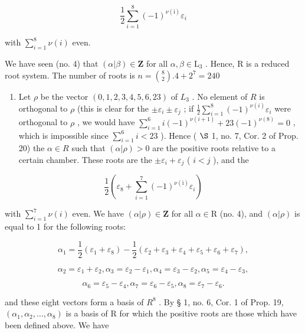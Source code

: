 \[
\frac {1}{2} \sum_ {i = 1} ^ {8} (- 1) ^ {\nu (\mathrm{i})} \varepsilon_ {i}
\]

with \(\sum_{i=1}^{8} \nu(i)\) even.

We have seen (no. 4) that \((\alpha |\beta)\in \mathbf{Z}\) for all \(\alpha ,\beta \in \mathrm{L}_3\) . Hence, R is a reduced root system. The number of roots is \(n = \binom{8}{2}.4 + 2^7 = 240\)

\begin{enumerate}
\def\labelenumi{(\Roman{enumi})}
\setcounter{enumi}{1}
\tightlist
\item
  Let \(\rho\) be the vector \((0,1,2,3,4,5,6,23)\) of \(L_{3}\) . No element of \(R\) is orthogonal to \(\rho\) (this is clear for the \(\pm \varepsilon_{i} \pm \varepsilon_{j}\) ; if \(\frac{1}{2} \sum_{i=1}^{8} (-1)^{\nu(i)} \varepsilon_{i}\) were orthogonal to \(\rho\) , we would have \(\sum_{i=1}^{6} i(-1)^{\nu(i+1)} + 23(-1)^{\nu(8)} = 0\) , which is impossible since \(\sum_{i=1}^{6} i < 23\) ). Hence ( \(\S\) 1, no. 7, Cor. 2 of Prop. 20) the \(\alpha \in R\) such that \((\alpha | \rho) > 0\) are the positive roots relative to a certain chamber. These roots are the \(\pm \varepsilon_{i} + \varepsilon_{j}\) ( \(i < j\) ), and the
\end{enumerate}

\[
\frac {1}{2} \left(\varepsilon_ {8} + \sum_ {i = 1} ^ {7} (- 1) ^ {\nu (\mathrm{i})} \varepsilon_ {i}\right)
\]

with \(\sum_{i=1}^{7} \nu(i)\) even. We have \((\alpha|\rho) \in \mathbf{Z}\) for all \(\alpha \in \mathrm{R}\) (no. 4), and \((\alpha|\rho)\) is equal to 1 for the following roots:

\[
\alpha_ {1} = \frac {1}{2} (\varepsilon_ {1} + \varepsilon_ {8}) - \frac {1}{2} (\varepsilon_ {2} + \varepsilon_ {3} + \varepsilon_ {4} + \varepsilon_ {5} + \varepsilon_ {6} + \varepsilon_ {7}),
\]

\[
\alpha_ {2} = \varepsilon_ {1} + \varepsilon_ {2}, \alpha_ {3} = \varepsilon_ {2} - \varepsilon_ {1}, \alpha_ {4} = \varepsilon_ {3} - \varepsilon_ {2}, \alpha_ {5} = \varepsilon_ {4} - \varepsilon_ {3},
\]

\[
\alpha_ {6} = \varepsilon_ {5} - \varepsilon_ {4}, \alpha_ {7} = \varepsilon_ {6} - \varepsilon_ {5}, \alpha_ {8} = \varepsilon_ {7} - \varepsilon_ {6}.
\]

and these eight vectors form a basis of \(R^{8}\) . By § 1, no. 6, Cor. 1 of Prop. 19, \((\alpha_{1}, \alpha_{2}, \ldots, \alpha_{8})\) is a basis of R for which the positive roots are those which have been defined above. We have

